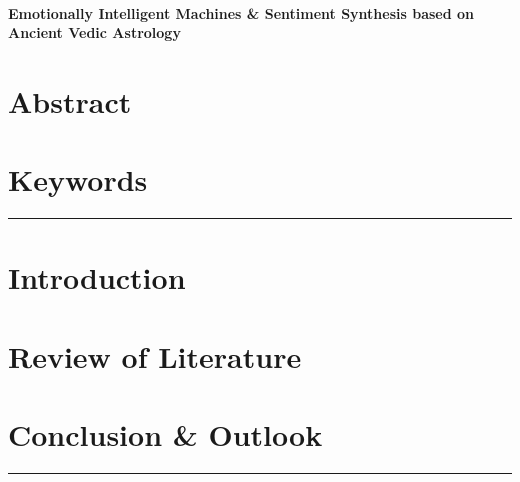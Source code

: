 \documentclass[12pt, a4paper, twoside]{article}
\date{}
\newcommand{\Title}[1]{{\LARGE \centering \hrulefill\\ \textbf{#1}\\ \hrulefill}}
\begin{document}
	\pagestyle{empty}
	
	
	
	\tableofcontents
	\newpage
	\pagestyle{plain}
	\Title{Emotionally Intelligent Machines \& Sentiment Synthesis based on Ancient Vedic Astrology}
	\section*{Abstract}
	
	\section*{Keywords}
	
	\newline
	\hrule
	\section{Introduction}
	
	\section{Review of Literature}
	
	\section{Conclusion \& Outlook}
	
	\hrule
	
	
\end{document}
